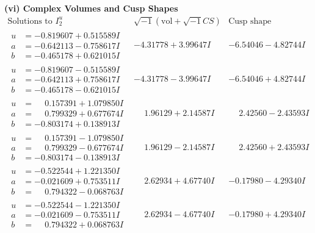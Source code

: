 \documentclass[1p]{elsarticle_modified}
\theoremstyle{definition}
\newcommand{\I}{\sqrt{-1}}
\begin{document}
\newpage\flushleft \textbf{(vi) Complex Volumes and Cusp Shapes}
$$\begin{array}{c|c|c}  
\text{Solutions to }I^u_{2}& \I (\text{vol} + \sqrt{-1}CS) & \text{Cusp shape}\\
 \hline 
\begin{aligned}
u &= -0.819607 + 0.515589 I \\
a &= -0.642113 - 0.758617 I \\
b &= -0.465178 + 0.621015 I\end{aligned}
 & -4.31778 + 3.99647 I & -6.54046 - 4.82744 I \\ \hline\begin{aligned}
u &= -0.819607 - 0.515589 I \\
a &= -0.642113 + 0.758617 I \\
b &= -0.465178 - 0.621015 I\end{aligned}
 & -4.31778 - 3.99647 I & -6.54046 + 4.82744 I \\ \hline\begin{aligned}
u &= \phantom{-}0.157391 + 1.079850 I \\
a &= \phantom{-}0.799329 + 0.677674 I \\
b &= -0.803174 + 0.138913 I\end{aligned}
 & \phantom{-}1.96129 + 2.14587 I & \phantom{-}2.42560 - 2.43593 I \\ \hline\begin{aligned}
u &= \phantom{-}0.157391 - 1.079850 I \\
a &= \phantom{-}0.799329 - 0.677674 I \\
b &= -0.803174 - 0.138913 I\end{aligned}
 & \phantom{-}1.96129 - 2.14587 I & \phantom{-}2.42560 + 2.43593 I \\ \hline\begin{aligned}
u &= -0.522544 + 1.221350 I \\
a &= -0.021609 + 0.753511 I \\
b &= \phantom{-}0.794322 - 0.068763 I\end{aligned}
 & \phantom{-}2.62934 + 4.67740 I & -0.17980 - 4.29340 I \\ \hline\begin{aligned}
u &= -0.522544 - 1.221350 I \\
a &= -0.021609 - 0.753511 I \\
b &= \phantom{-}0.794322 + 0.068763 I\end{aligned}
 & \phantom{-}2.62934 - 4.67740 I & -0.17980 + 4.29340 I \\ \hline\begin{aligned}

\end{aligned}
\end{array}$$
\end{document}
